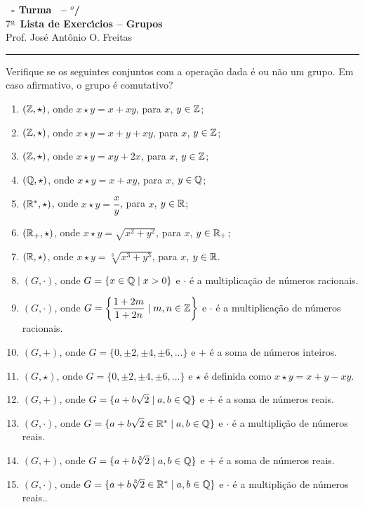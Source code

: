 \documentclass[12pt]{exam}
\begin{document}
\begin{center}
{\Large\bf \disciplina\ - Turma \turma\ -- \semestre$^{o}$/\ano} \\ \vspace{9pt} {\large\bf
  $7^{\underline{a}}$ Lista de Exerc{\'\i}cios -- Grupos}\\ \vspace{9pt} Prof. Jos{\'e} Ant{\^o}nio O. Freitas
\end{center}
\hrule

\vspace{.6cm}
\questao{} Verifique se os seguintes conjuntos com a opera\c{c}\~ao dada \'e ou n\~ao um grupo. Em caso afirmativo, o grupo \'e comutativo?
\begin{enumerate}[label=({\alph*})]
	\item $(\mathbb{Z}, \star)$, onde $x \star y = x + xy$, para $x$, $y \in \mathbb{Z}$;
	\item $(\mathbb{Z}, \star)$, onde $x \star y = x + y + xy$, para $x$, $y \in \mathbb{Z}$;
	\item $(\mathbb{Z}, \star)$, onde $x \star y = xy + 2x$, para $x$, $y \in \mathbb{Z}$;
	\item $(\mathbb{Q}, \star)$, onde $x \star y = x + xy$, para $x$, $y \in \mathbb{Q}$;
	\item $(\mathbb{R}^*, \star)$, onde $x \star y = \dfrac{x}{y}$, para $x$, $y \in \mathbb{R}$;
	\item $(\mathbb{R}_+, \star)$, onde $x \star y = \sqrt{x^2 + y^2}$, para $x$, $y \in \mathbb{R}_+$;
	\item $(\mathbb{R}, \star)$, onde $x \star y = \sqrt[3]{x^3 + y^3}$, para $x$, $y \in \mathbb{R}$.
	\item $(G, \cdot)$, onde $G = \{x \in \mathbb{Q} \mid x > 0\}$ e $\cdot$ \'e a multiplica\c{c}\~ao de n\'umeros racionais.
	\item $(G, \cdot)$, onde $G = \left\{\dfrac{1 + 2m}{1 + 2n} \mid m, n \in \mathbb{Z}\right\}$ e $\cdot$ \'e a multiplica\c{c}\~ao de n\'umeros racionais.
	\item $(G, +)$, onde $G = \{0, \pm 2, \pm 4, \pm 6, \dots\}$ e $+$ \'e a soma de n\'umeros inteiros.
	\item $(G, \star)$, onde $G = \{0, \pm 2, \pm 4, \pm 6, \dots\}$ e $\star$ \'e definida como $x \star y = x + y - xy$.
	\item $(G, +)$, onde $G = \{a + b\sqrt{2} \mid a, b \in \mathbb{Q}\}$ e $+$ \'e a soma de n\'umeros reais.
	\item $(G, \cdot)$, onde $G = \{a + b\sqrt{2} \in \mathbb{R}^* \mid a, b \in \mathbb{Q}\}$ e $\cdot$ \'e a multipli\c{c}\~ao de n\'umeros reais.
	\item $(G, +)$, onde $G = \{a + b\sqrt[3]{2} \mid a, b \in \mathbb{Q}\}$ e $+$ \'e a soma de n\'umeros reais.
	\item $(G, \cdot)$, onde $G = \{a + b\sqrt[3]{2} \in \mathbb{R}^* \mid a, b \in \mathbb{Q}\}$ e $\cdot$ \'e a multipli\c{c}\~ao de n\'umeros reais..
\end{enumerate}
\end{document}
